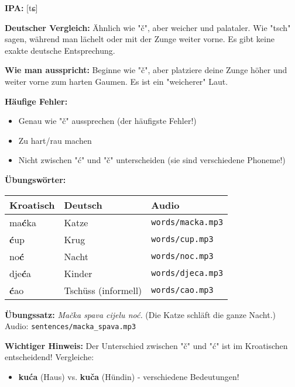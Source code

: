 \begin{tcolorbox}[breakable, colback=lightblue!30, colframe=croatianblue, title=\textbf{Ć, ć}]

\textbf{IPA:} [tɕ]

\textbf{Deutscher Vergleich:}
Ähnlich wie "č", aber weicher und palataler. Wie "tsch" sagen, während man lächelt oder mit der Zunge weiter vorne. Es gibt keine exakte deutsche Entsprechung.

\textbf{Wie man ausspricht:}
Beginne wie "č", aber platziere deine Zunge höher und weiter vorne zum harten Gaumen. Es ist ein "weicherer" Laut.

\textbf{Häufige Fehler:}
\begin{itemize}
    \item Genau wie "č" aussprechen (der häufigste Fehler!)
    \item Zu hart/rau machen
    \item Nicht zwischen "ć" und "č" unterscheiden (sie sind verschiedene Phoneme!)
\end{itemize}

\textbf{Übungswörter:}
\begin{center}
\small
\begin{tabular}{lll}
\textbf{Kroatisch} & \textbf{Deutsch} & \textbf{Audio} \\
\midrule
ma\textbf{ć}ka & Katze & \small\texttt{words/macka.mp3} \\
\textbf{ć}up & Krug & \small\texttt{words/cup.mp3} \\
no\textbf{ć} & Nacht & \small\texttt{words/noc.mp3} \\
dje\textbf{ć}a & Kinder & \small\texttt{words/djeca.mp3} \\
\textbf{ć}ao & Tschüss (informell) & \small\texttt{words/cao.mp3} \\
\end{tabular}
\end{center}

\textbf{Übungssatz:}
\textit{Mačka spava cijelu noć.}
(Die Katze schläft die ganze Nacht.)
Audio: \small\texttt{sentences/macka\_spava.mp3}

\textbf{Wichtiger Hinweis:}
Der Unterschied zwischen "č" und "ć" ist im Kroatischen entscheidend! Vergleiche:
\begin{itemize}
    \item \textbf{kuća} (Haus) vs. \textbf{kuča} (Hündin) - verschiedene Bedeutungen!
\end{itemize}

\end{tcolorbox}

